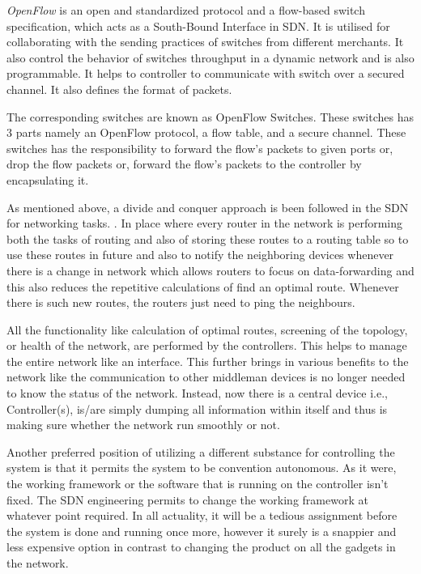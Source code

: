     \textit{OpenFlow} is an open and standardized protocol and a flow-based switch specification, which acts as a South-Bound Interface in SDN. It is utilised for collaborating with the sending practices of switches from different merchants. It also control the behavior of switches throughput in a dynamic network and is also programmable. It helps to controller to communicate with switch over a secured channel. It also defines the format of packets.
    
    The corresponding switches are known as OpenFlow Switches. These switches has 3 parts namely an OpenFlow protocol, a flow table, and a secure channel. These switches has the responsibility to forward the flow's packets to given ports or, drop the flow packets or, forward the flow's packets to the controller by encapsulating it.

    As mentioned above, a divide and conquer approach is been followed in the SDN for networking tasks. \cite{taxonomy2014}. In place where every router in the network is performing both the tasks of routing and also of storing these routes to a routing table so to use these routes in future and also to notify the neighboring devices whenever there is a change in network which allows routers to focus on data-forwarding and this also reduces the repetitive calculations of find an optimal route. Whenever there is such new routes, the routers just need to ping the neighbours.
    
    All the functionality like calculation of optimal routes, screening of the topology, or health of the network, are performed by the controllers. This helps to manage the entire network like an interface. This further brings in various benefits to the network like the communication to other middleman devices is no longer needed to know the status of the network. Instead, now there is a central device i.e., Controller(s),  is/are simply dumping all information within itself and thus is making sure whether the network run smoothly or not.

Another preferred position of utilizing a different substance for controlling the system is that it permits the system to be convention autonomous. As it were, the working framework or the software that is running on the controller isn't fixed. The SDN engineering permits to change the working framework at whatever point required. \cite{arpanet2004} In all actuality, it will be a tedious assignment before the system is done and running once more, however it surely is a snappier and less expensive option in contrast to changing the product on all the gadgets in the network.

